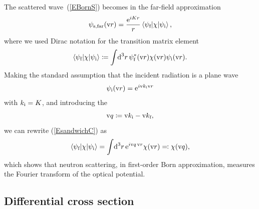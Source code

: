 The scattered wave~(\ref{EBornS})
becomes in the far-field approximation 
\begin{equation}\label{EsandwichC}
  \psi_\text{s,far}(\text{v}{r})
  = \frac{\text{e}^{iKr}}{r}
    \left\langle \psi_{\text{f}}|\chi|\psi_{\text{i}}\right\rangle,
\end{equation}
%
where we used Dirac notation for the transition matrix element
%
\begin{equation}\label{Etrama}
  \left\langle \psi_{\text{f}}|\chi|\psi_{\text{i}}\right\rangle
  \coloneqq  \int\!\text{d}^3r\, \psi^*_{\text{f}}(\text{v}{r})\chi(\text{v}{r})\psi_{\text{i}}(\text{v}{r}).
\end{equation}
%
Making the standard assumption
that the incident radiation is a plane wave
\begin{equation}\label{EPsi0Plane}
  \psi_{\text{i}}(\text{v}{r})=\text{e}^{i \text{v}{k}_{\text{i}} \text{v}{r}}
\end{equation}
with $k_{\text{i}}=K$,
and introducing the 
%
\begin{equation}
  \text{v}{q}\coloneqq \text{v}{k}_{\text{i}}-\text{v}{k}_{\text{f}},
\end{equation}
%
we can rewrite (\ref{EsandwichC}) as
\begin{equation}\label{EBornQ}
  \left\langle \psi_{\text{f}}|\chi|\psi_{\text{i}}\right\rangle
  = \int\!\text{d}^3r\, \text{e}^{i\text{v}{q}\,\text{v}{r}}\chi(\text{v}{r})
  \eqqcolon  \chi(\text{v}{q}),
\end{equation}
%
which shows that neutron scattering,
in first-order Born approximation,
measures the Fourier transform
of the optical potential.
%

%

\subsection{Differential cross section}

